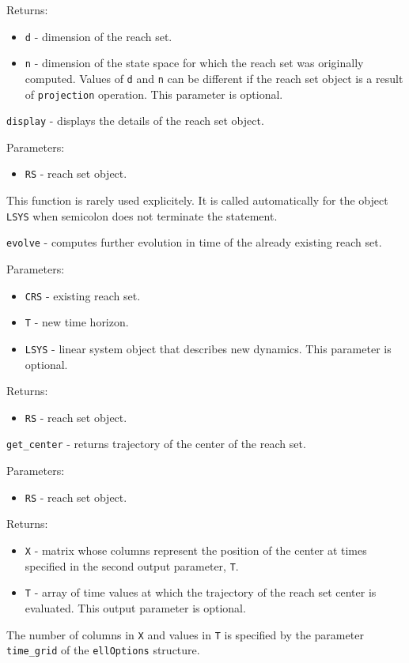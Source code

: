 \documentclass{report}
\begin{document}
Returns:
\begin{itemize}
\item {\tt d} - dimension of the reach set.
\item {\tt n} - dimension of the state space for which the reach set was
originally computed. Values of {\tt d} and {\tt n} can be different if
the reach set object is a result of {\tt projection} operation.
This parameter is optional.
\end{itemize}

\newpage

{\Large {\tt display}} - displays the details of the reach set object.

Parameters:
\begin{itemize}
\item {\tt RS} - reach set object.
\end{itemize}
This function is rarely used explicitely. It is called automatically
for the object {\tt LSYS} when semicolon does not terminate the statement.

\newpage

{\Large {\tt evolve}} - computes further evolution in time of the already
existing reach set.

Parameters:
\begin{itemize}
\item {\tt CRS} - existing reach set.
\item {\tt T} - new time horizon.
\item {\tt LSYS} - linear system object that describes new dynamics.
This parameter is optional.
\end{itemize}

Returns:
\begin{itemize}
\item {\tt RS} - reach set object.
\end{itemize}

\newpage

{\Large {\tt get\_center}} - returns trajectory of the center of the reach set.

Parameters:
\begin{itemize}
\item {\tt RS} - reach set object.
\end{itemize}

Returns:
\begin{itemize}
\item {\tt X} - matrix whose columns represent the position of the center
at times specified in the second output parameter, {\tt T}.
\item {\tt T} - array of time values at which the trajectory of the reach set
center is evaluated. This output parameter is optional.
\end{itemize}
The number of columns in {\tt X} and values in {\tt T}
is specified by the parameter
{\tt time\_grid} of the {\tt ellOptions} structure.
\end{document}
